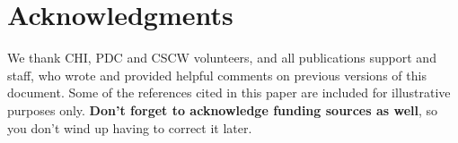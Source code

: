 \documentclass{sigchi-alternate}
\begin{document}
\section{Acknowledgments}

We thank CHI, PDC and CSCW volunteers, and all publications support
and staff, who wrote and provided helpful comments on previous
versions of this document.  Some of the references cited in this paper
are included for illustrative purposes only.  \textbf{Don't forget
to acknowledge funding sources as well}, so you don't wind up
having to correct it later.

%
%
%
%
%
\balance



\end{document}
